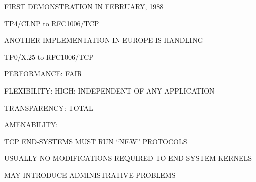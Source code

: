 \begin{bwslide}

\begin{nrtc}
\item	FIRST DEMONSTRATION IN FEBRUARY, 1988
    \begin{nrtc}
    \item	TP4/CLNP to RFC1006/TCP
    \end{nrtc}

\item	ANOTHER IMPLEMENTATION IN EUROPE IS HANDLING
    \begin{nrtc}
    \item	TP0/X.25 to RFC1006/TCP
    \end{nrtc}
\end{nrtc}
\end{bwslide}


\begin{bwslide}

\begin{nrtc}
\item	PERFORMANCE: FAIR

\item	FLEXIBILITY: HIGH; INDEPENDENT OF ANY APPLICATION

\item	TRANSPARENCY: TOTAL

\item	AMENABILITY:
    \begin{nrtc}
    \item	TCP END-SYSTEMS MUST RUN ``NEW'' PROTOCOLS
	\begin{nrtc}
	\item	USUALLY NO MODIFICATIONS REQUIRED TO END-SYSTEM KERNELS
	\end{nrtc}

    \item	MAY INTRODUCE ADMINISTRATIVE PROBLEMS
    \end{nrtc}
\end{nrtc}
\end{bwslide}



